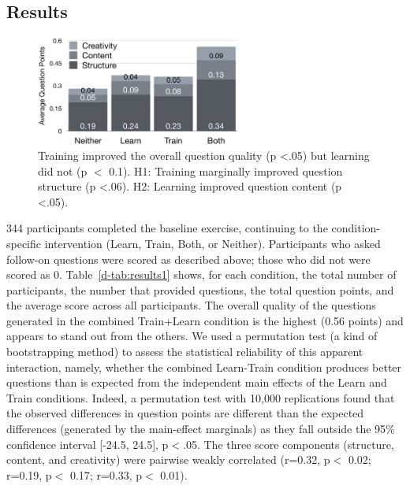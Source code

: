 \subsection*{Results}

\begin{figure}[h]
  \centering
  \includegraphics[width=0.6\textwidth]{figures/docent/fig-5.png}
  \caption[Training improved the overall question quality but learning did not]
{Training improved the overall question quality (p <.05) but learning did not (p $<$ 0.1). H1: Training marginally improved question structure (p <.06). H2: Learning improved question content (p <.05).}
  \label{fig:docent-5}
\end{figure}


344 participants completed the baseline exercise, continuing to the condition-specific intervention (Learn, Train, Both, or Neither). Participants who asked follow-on questions were scored as described above; those who did not were scored as 0. Table~\ref{d-tab:results1} shows, for each condition, the total number of participants, the number that provided questions, the total question points, and the average score across all participants. The overall quality of the questions generated in the combined Train+Learn condition is the highest (0.56 points) and appears to stand out from the others. We used a permutation test (a kind of bootstrapping method) to assess the statistical reliability of this apparent interaction, namely, whether the combined Learn-Train condition produces better questions than is expected from the independent main effects of the Learn and Train conditions. Indeed, a permutation test with 10,000 replications found that the observed differences in question points are different than the expected differences (generated by the main-effect marginals) as they fall outside the 95\% confidence interval [-24.5, 24.5], p$ <$.05. The three score components (structure, content, and creativity) were pairwise weakly correlated (r=0.32, p$ <$ 0.02; r=0.19, p$ <$ 0.17; r=0.33, p$ <$ 0.01). 

